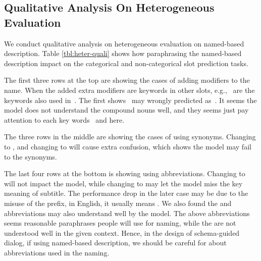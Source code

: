 \subsection[Qualitative Analysis On Heterogeneous
Evaluation]{Qualitative Analysis On Heterogeneous \\Evaluation}
\label{ssec:qualitative-analysis}
We conduct qualitative analysis on heterogeneous evaluation on
named-based description. Table \ref{tbl:heter-quali} shows how paraphrasing the
named-based description impact on the categorical and non-categorical
slot prediction tasks.

The first three rows at the top are showing the cases of adding modifiers
to the name. When the added extra modifiers are keywords in other
slots, e.g.,~ are the keywords also used
in~. The first
shows~ may wrongly predicted
as~. It seems the model does not understand
the compound nouns well, and they seems just pay attention to each key
words~ and  here.

The three rows in the middle are showing the cases of using
synonyms. Changing  to , and changing  to  will
cause extra confusion, which shows the model may fail to the synonyms.

The last four rows at the bottom is showing using abbreviations. Changing
 to  will not impact the model, while
changing  to  may let the model miss
the key meaning of subtitle.  The performance drop in the later case
may be due to the misuse of the  prefix, in English, it
usually means . We also
found the  and  abbreviations may also understand well by
the model. The above abbreviations seems reasonable paraphrases people
will use for naming, while the are not understood well in the given
context. Hence, in the design of schema-guided dialog, if using
named-based description, we should be careful for about abbreviations
used in the naming.

